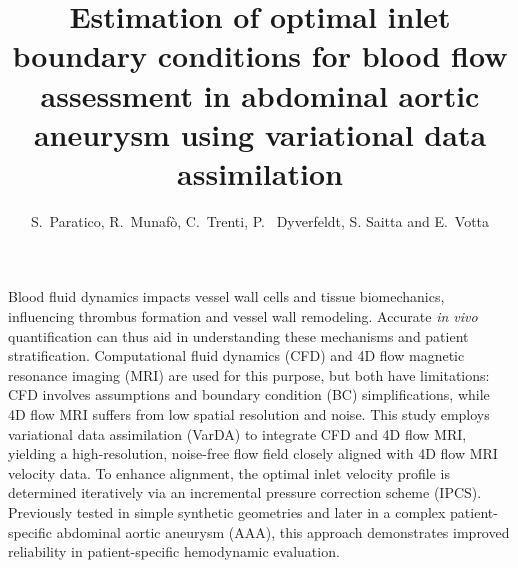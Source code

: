 \graphicspath{{chapters/chp1/graphics/}}

\title{Estimation of optimal inlet boundary conditions for blood flow assessment in abdominal aortic aneurysm using variational data assimilation}

\author{S.~Paratico, R.~Munaf\`o, C.~Trenti, P.~ Dyverfeldt, S. Saitta and E.~Votta}

\maketitle

\abstract{}
Blood fluid dynamics impacts vessel wall cells and tissue biomechanics, influencing thrombus formation and vessel wall remodeling. Accurate \textit{in vivo} quantification can thus aid in understanding these mechanisms and patient stratification. Computational fluid dynamics (CFD) and 4D flow magnetic resonance imaging (MRI) are used for this purpose, but both have limitations: CFD involves assumptions and boundary condition (BC) simplifications, while 4D flow MRI suffers from low spatial resolution and noise. This study employs variational data assimilation (VarDA) to integrate CFD and 4D flow MRI, yielding a high-resolution, noise-free flow field closely aligned with 4D flow MRI velocity data. To enhance alignment, the optimal inlet velocity profile is determined iteratively via an incremental pressure correction scheme (IPCS). Previously tested in simple synthetic geometries and later in a complex  patient-specific abdominal aortic aneurysm (AAA), this approach demonstrates improved reliability in patient-specific hemodynamic evaluation. 


